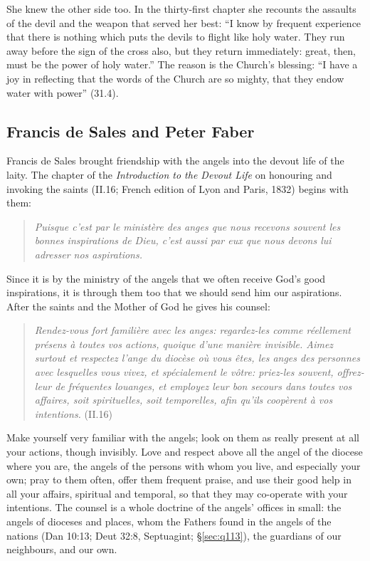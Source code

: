She knew the other side too. In the thirty-first chapter she recounts the
assaults of the devil and the weapon that served her best: ``I know by
frequent experience that there is nothing which puts the devils to flight
like holy water. They run away before the sign of the cross also, but they
return immediately: great, then, must be the power of holy water.'' The
reason is the Church's blessing: ``I have a joy in reflecting that the words
of the Church are so mighty, that they endow water with power'' (31.4).

\sectionguard\subsection{Francis de Sales and Peter Faber}\label{sec:sa-desales}

Francis de Sales brought friendship with the angels into the devout life of
the laity. The chapter of the \emph{Introduction to the Devout Life} on
honouring and invoking the saints (II.16; French edition of Lyon and Paris,
1832) begins with them:
\begin{quote}
\textit{Puisque c'est par le ministère des anges que nous recevons souvent
les bonnes inspirations de Dieu, c'est aussi par eux que nous devons lui
adresser nos aspirations.}
\end{quote}
Since it is by the ministry of the angels that we often receive God's good
inspirations, it is through them too that we should send him our
aspirations. After the saints and the Mother of God he gives his counsel:
\begin{quote}
\textit{Rendez-vous fort familière avec les anges: regardez-les comme
réellement présens à toutes vos actions, quoique d'une manière invisible.
Aimez surtout et respectez l'ange du diocèse où vous êtes, les anges des
personnes avec lesquelles vous vivez, et spécialement le vôtre: priez-les
souvent, offrez-leur de fréquentes louanges, et employez leur bon secours
dans toutes vos affaires, soit spirituelles, soit temporelles, afin qu'ils
coopèrent à vos intentions.} (II.16)
\end{quote}
Make yourself very familiar with the angels; look on them as really present
at all your actions, though invisibly. Love and respect above all the angel
of the diocese where you are, the angels of the persons with whom you live,
and especially your own; pray to them often, offer them frequent praise,
and use their good help in all your affairs, spiritual and temporal, so that
they may co-operate with your intentions. The counsel is a whole doctrine
of the angels' offices in small: the angels of dioceses and places, whom the
Fathers found in the angels of the nations (Dan 10:13; Deut 32:8,
Septuagint; \S\ref{sec:q113}), the guardians of our neighbours, and our own.


